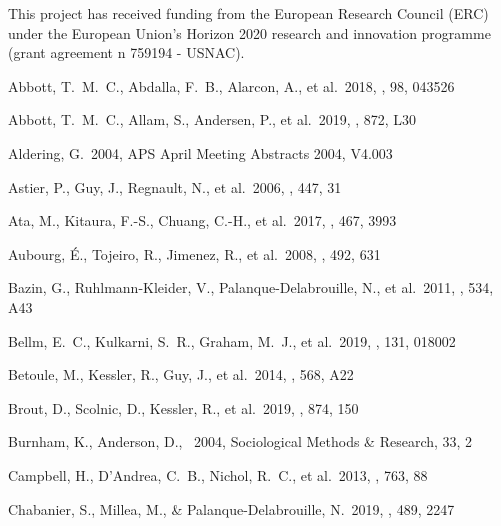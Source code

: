 \documentclass[]{aa} %
\begin{document}
\begin{acknowledgements}
    This project has received funding from the European Research Council (ERC)
    under the European Union's Horizon 2020 research and innovation programme
    (grant agreement n 759194 - USNAC).
\end{acknowledgements}

\begin{thebibliography}{} 
 Abbott, T.~M.~C., Abdalla, F.~B., Alarcon, A., et al.\ 2018, \prd, 98, 043526

 Abbott, T.~M.~C., Allam, S., Andersen, P., et al.\ 2019, \apjl, 872, L30

 Aldering, G.\ 2004, APS April Meeting Abstracts 2004, V4.003

 Astier, P., Guy, J., Regnault, N., et al.\ 2006, \aap, 447, 31


 Ata, M., Kitaura, F.-S., Chuang, C.-H., et al.\ 2017, \mnras, 467, 3993

 Aubourg, {\'E}.,
  Tojeiro, R., Jimenez, R., et al.\ 2008, \aap, 492, 631 


 Bazin, G., Ruhlmann-Kleider, V., Palanque-Delabrouille, N., et al.\ 2011, \aap, 534, A43

 Bellm, E.~C., Kulkarni, S.~R., Graham, M.~J., et al.\ 2019, \pasp, 131, 018002

 Betoule, M., Kessler, R., Guy, J., et al.\ 2014, \aap, 568, A22

 Brout, D., Scolnic, D., Kessler, R., et al.\ 2019, \apj, 874, 150

 Burnham, K., Anderson, D., \
2004, Sociological Methods \& Research, 33, 2

 Campbell, H., D'Andrea, C.~B., Nichol, R.~C., et al.\ 2013, \apj, 763, 88


 Chabanier, S., Millea, M., \& Palanque-Delabrouille, N.\ 2019, \mnras, 489, 2247


\end{thebibliography}
\end{document}
